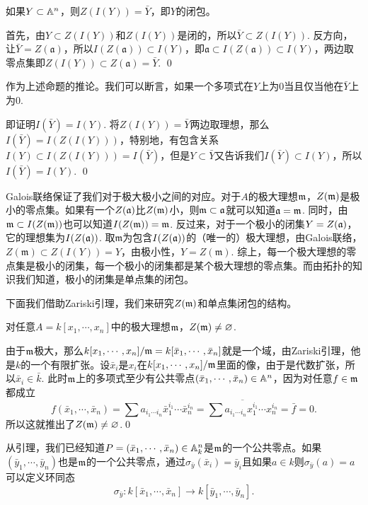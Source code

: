 \pro 如果$Y \subset \mathbb{A}^n$，则$Z(I(Y))=\bar{Y}$，即$Y$的闭包。

\proof 首先，由$Y\subset Z(I(Y))$和$Z(I(Y))$是闭的，所以$\bar{Y}\subset Z(I(Y))$. 反方向，让$\bar{Y}=Z(\mathfrak{a})$，所以$I(Z(\mathfrak{a}))\subset I(Y)$，即$\mathfrak{a}\subset I(Z(\mathfrak{a}))\subset I(Y)$，两边取零点集即$Z(I(Y))\subset Z(\mathfrak{a})=\bar{Y}$. \qed

\para 作为上述命题的推论。我们可以断言，如果一个多项式在$Y$上为$0$当且仅当他在$\bar{Y}$上为$0$. 

\proof 即证明$I(\bar{Y})=I(Y)$. 将$Z(I(Y))=\bar{Y}$两边取理想，那么$I(\bar{Y})=I(Z(I(Y)))$，特别地，有包含关系$I(Y)\subset I(Z(I(Y)))=I(\bar{Y})$，但是$Y\subset \bar{Y}$又告诉我们$I(\bar{Y})\subset I(Y)$，所以$I(\bar{Y})=I(Y)$. \qed

\para Galois联络保证了我们对于极大极小之间的对应。对于$A$的极大理想$\mathfrak{m}$，$Z(\mathfrak{m})$是极小的零点集。如果有一个$Z(\mathfrak{a})$比$Z(\mathfrak{m})$小，则$\mathfrak{m}\subset \mathfrak{a}$就可以知道$\mathfrak{a}=\mathfrak{m}$. 同时，由$\mathfrak{m} \subset I(Z(\mathfrak{m}))$也可以知道$I(Z(\mathfrak{m}))=\mathfrak{m}$. 反过来，对于一个极小的闭集$Y=Z(\mathfrak{a})$，它的理想集为$I(Z(\mathfrak{a}))$. 取$\mathfrak{m}$为包含$I(Z(\mathfrak{a}))$的（唯一的）极大理想，由Galois联络，$Z(\mathfrak{m})\subset Z(I(Y))=Y$，由极小性，$Y=Z(\mathfrak{m})$. 综上，每一个极大理想的零点集是极小的闭集，每一个极小的闭集都是某个极大理想的零点集。而由拓扑的知识我们知道，极小的闭集是单点集的闭包。

下面我们借助Zariski引理，我们来研究$Z(\mathfrak{m})$和单点集闭包的结构。

\lem 对任意$A=k[x_1,\cdots,x_n]$中的极大理想$\mathfrak{m}$，$Z(\mathfrak{m})\neq\varnothing$.

\proof 由于$\mathfrak{m}$极大，那么$k[x_1,\cdots,x_n]/\mathfrak{m}=k[\bar{x}_1,\cdots,\bar{x}_n]$就是一个域，由Zariski引理，他是$k$的一个有限扩张。设$\bar{x}_i$是$x_i$在$k[x_1,\cdots,x_n]/\mathfrak{m}$里面的像，由于是代数扩张，所以$\bar{x}_i\in \bar{k}$. 此时$\mathfrak{m}$上的多项式至少有公共零点$(\bar{x}_1,\cdots,\bar{x}_n)\in \mathbb{A}^n$，因为对任意$f\in \mathfrak{m}$都成立
\[
	f(\bar{x}_1,\cdots,\bar{x}_n)=\sum a_{i_1\cdots i_n} {\bar{x}}_1^{i_1}\cdots {\bar{x}}_n^{i_n}=\overline{\sum a_{i_1\cdots i_n} x_1^{i_1}\cdots x_n^{i_n}}=\bar{f}=0.
\]
所以这就推出了$Z(\mathfrak{m})\neq\varnothing$.\qed 

从引理，我们已经知道$P=(\bar{x}_1,\cdots,\bar{x}_n)\in \mathbb{A}^n_k$是$\mathfrak{m}$的一个公共零点。如果$(\bar{y}_1,\cdots,\bar{y}_n)$也是$\mathfrak{m}$的一个公共零点，通过$\sigma_{\bar{y}}(\bar{x}_i)=\bar{y}_i$且如果$a\in k$则$\sigma_{\bar{y}}(a)=a$可以定义环同态
\[
	\sigma_{\bar{y}}:k[\bar{x}_1,\cdots,\bar{x}_n]\to k[\bar{y}_1,\cdots,\bar{y}_n].
\]

